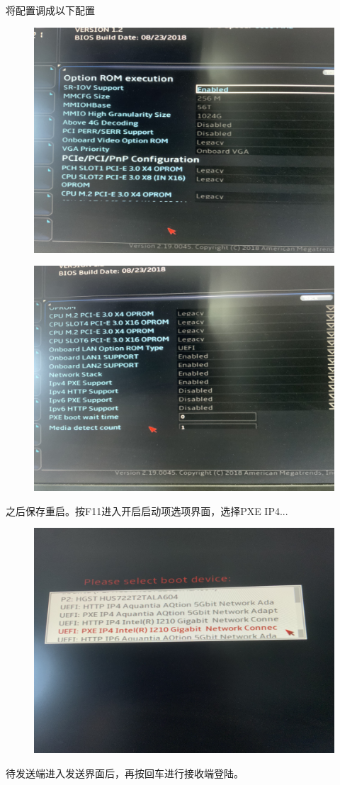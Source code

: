 \documentclass[openbib]{article}
\begin{document}
将配置调成以下配置
\begin{figure}[H]
	\centering
	\includegraphics[scale=0.05]{55}
\end{figure}
\begin{figure}[H]
	\centering
	\includegraphics[scale=0.05]{56}
\end{figure}

之后保存重启。按F11进入开启启动项选项界面，选择PXE IP4...
\begin{figure}[H]
	\centering
	\includegraphics[scale=0.05]{58}
\end{figure}

待发送端进入发送界面后，再按回车进行接收端登陆。
\end{document}

